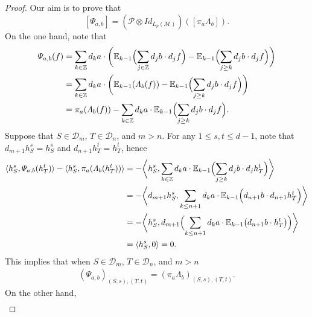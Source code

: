 \documentclass[oneside,english,a4wide]{amsart}
\numberwithin{equation}{section}
\numberwithin{figure}{section}
\theoremstyle{plain}
\theoremstyle{plain}
\theoremstyle{definition}
\theoremstyle{plain}
\theoremstyle{remark}
\theoremstyle{definition}
\theoremstyle{remark}
\theoremstyle{definition}
\newcommand{\8}{\infty}
\begin{document}
\begin{proof}
	Our aim is to prove that
	\begin{equation}\label{varpsi}
		[\varPsi_{a,b}]=(\mathcal{P}\otimes Id_{L_p(\mathcal{M})})([\pi_{a}\varLambda_{b}]).
	\end{equation}
	On the one hand, note that
	\begin{equation}\label{varpsif}
		\begin{aligned}
			\varPsi_{a,b}(f){}&=\sum_{k\in\mathbb{Z}} d_ka\cdot\biggl(\mathbb{E}_{k-1}\Bigl(\sum_{j\in\mathbb{Z}} d_j{b}\cdot d_j{f}\Bigr)-\mathbb{E}_{k-1}\Bigl(\sum_{j\ge k} d_j{b}\cdot d_j{f}\Bigr)\biggr)\\
			&=\sum_{k\in\mathbb{Z}} d_ka\cdot\biggl(\mathbb{E}_{k-1}(\varLambda_{{b}}({f}))-\mathbb{E}_{k-1}\Bigl(\sum_{j\ge k} d_j{b}\cdot d_j{f}\Bigr)\biggr)\\
			&=\pi_a(\varLambda_{{b}}({f}))-\sum_{k\in\mathbb{Z}} d_ka\cdot \mathbb{E}_{k-1}\Bigl(\sum_{j\ge k} d_j{b}\cdot d_j{f}\Bigr).
		\end{aligned}
	\end{equation}
	Suppose that $S\in \mathcal{D}_m$, $T\in\mathcal{D}_n$, and $m>n$. For any $1\le s,t\le d-1$, note that $d_{m+1}h_S^s=h_S^s$ and $d_{n+1}h_T^t=h_T^t$, hence
	\begin{equation*}
		\begin{aligned}
			\langle h_S^s,\varPsi_{a,b}(h_T^t)\rangle-\langle h_S^s,\pi_a(\varLambda_b(h_T^t))\rangle{}&=-\biggl\langle h_S^s, \sum_{k\in\mathbb{Z}} d_ka\cdot \mathbb{E}_{k-1}\Bigl(\sum_{j\ge k} d_j{b}\cdot d_j{h_T^t}\Bigr)\biggr\rangle \\
			&=-\biggl\langle d_{m+1}h_S^s, \sum_{k\leq {n+1}} d_ka\cdot \mathbb{E}_{k-1}\Bigl(d_{n+1}{b}\cdot d_{n+1}{h_T^t}\Bigr)\biggr\rangle\\
			&=-\biggl\langle h_S^s, d_{m+1}\Bigl(\sum_{k\le n+1} d_ka\cdot \mathbb{E}_{k-1}\bigl(d_{n+1}{b}\cdot {h_T^t}\bigr)\Bigr)\biggr\rangle\\
			&=\langle h_S^s,0\rangle=0.
		\end{aligned}
	\end{equation*}
	This implies that when $S\in \mathcal{D}_m$, $T\in\mathcal{D}_n$, and $m>n$
	\begin{equation}\label{pusiab}
		\begin{aligned}
			(\varPsi_{a,b})_{(S,s),(T,t)}=(\pi_a\varLambda_b)_{(S,s),(T,t)}.
		\end{aligned}
	\end{equation}
	On the other hand, 
	\begin{equation*}
		\begin{aligned}

\end{aligned}
\end{equation*}
\end{proof}
\end{document}
